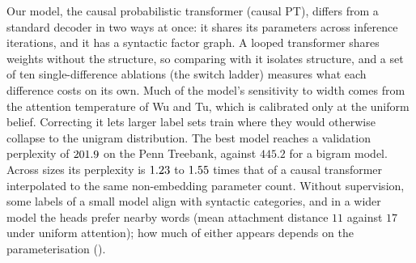 Our model, the causal probabilistic transformer (causal PT), differs from a standard decoder in
two ways at once: it shares its parameters across inference iterations, and it has a syntactic
factor graph. A looped transformer shares weights without the structure, so comparing with it
isolates structure, and a set of ten single-difference ablations (the switch ladder) measures
what each difference costs on its own. Much of the model's sensitivity to width comes from the
attention temperature of Wu and Tu, which is calibrated only at the uniform belief. Correcting
it lets larger label sets train where they would otherwise collapse to the unigram
distribution. The best model reaches a validation perplexity of $201.9$ on the Penn
Treebank, against $445.2$ for a bigram model. Across sizes its perplexity is $1.23$
to $1.55$ times that of a causal transformer interpolated to the same non-embedding
parameter count. Without supervision, some
labels of a small model align with syntactic categories, and in a wider model the heads prefer
nearby words (mean attachment distance $11$ against $17$ under uniform attention); how much of
either appears depends on the parameterisation ().
